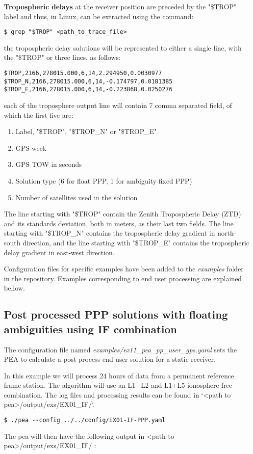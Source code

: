 \textbf{Tropospheric delays} at the receiver position are preceded by the "\$TROP" label and thus, in Linux, can be extracted using the command:
 \begin{verbatim}
$ grep "$TROP" <path_to_trace_file>
\end{verbatim}
the tropospheric delay solutions will be represented to either a single line, with the "\$TROP" or three lines, as follows:
\begin{verbatim}
$TROP,2166,278015.000,6,14,2.294950,0.0030977
$TROP_N,2166,278015.000,6,14,-0.174797,0.0181385
$TROP_E,2166,278015.000,6,14,-0.223868,0.0250276
\end{verbatim}
each of the troposphere output line will contain 7 comma separated field, of which the first five are:
\begin{enumerate}
	\item  Label, "\$TROP", "\$TROP\_N" or "\$TROP\_E"
	\item  GPS week
	\item  GPS TOW in seconds
	\item  Solution type (6 for float PPP, 1 for ambiguity fixed PPP)
	\item  Number of satellites used in the solution
\end{enumerate}
The line starting with "\$TROP" contain the Zenith Tropospheric Delay (ZTD) and its standards deviation, both in meters, as their last two fields.  The line starting with "\$TROP\_N" contains the tropospheric delay gradient in north-south direction, and  the line starting with "\$TROP\_E" contains the tropospheric delay gradient in east-west direction.

Configuration files for specific examples have been added to the \textit{examples} folder in the repository. Examples corresponding to end user processing are explained bellow.

\subsection{Post processed PPP solutions with floating ambiguities using IF combination}
The configuration file named \textit{examples/ex11_pea_pp_user_gps.yaml} sets the PEA to calculate a post-process end user solution for a static receiver. 
 
In this example we will process 24 hours of data from a permanent reference frame station. The algorithm will use an L1+L2 and L1+L5 ionosphere-free combination.
The log files and processing results can be found in `<path to pea>/output/exs/EX01\_IF/`.
\begin{lstlisting}
$ ./pea --config ../../config/EX01-IF-PPP.yaml
\end{lstlisting}
The pea will then have the following output in <path to pea>/output/exs/EX01\_IF/ :

